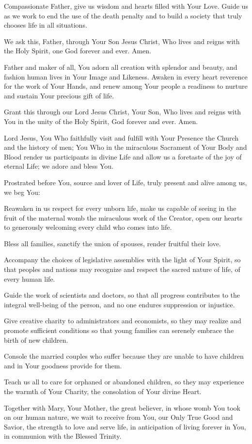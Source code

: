 Compassionate Father, give us wisdom and hearts filled with Your Love.
Guide us as we work to end the use of the death penalty and to build a society that truly chooses life in all situations.

We ask this, Father, through Your Son Jesus Christ, Who lives and reigns with the Holy Spirit, one God forever and ever.
Amen.

Father and maker of all, You adorn all creation with splendor and beauty, and fashion human lives in Your Image and Likeness.
Awaken in every heart reverence for the work of Your Hands, and renew among Your people
a readiness to nurture and sustain Your precious gift of life.

Grant this through our Lord Jesus Christ, Your Son, Who lives and reigns with You in 
the unity of the Holy Spirit, God forever and ever.
Amen.

\label{prayer:benedict_xvi_unborn}
Lord Jesus, 
You Who faithfully visit and fulfill with Your Presence the Church and the history of men;
You Who in the miraculous Sacrament of Your Body and Blood render us participants in divine Life and allow us a foretaste of the joy of eternal Life;
we adore and bless You.

Prostrated before You, source and lover of Life, truly present and alive among us, we beg You:

Reawaken in us respect for every unborn life, make us capable of seeing in the fruit of the maternal womb the miraculous work of the Creator, open our hearts to generously welcoming every child who comes into life.

Bless all families, sanctify the union of spouses, render fruitful their love.

Accompany the choices of legislative assemblies with the light of Your Spirit, so that peoples and nations may recognize and respect the sacred nature of life, of every human life.

Guide the work of scientists and doctors, so that all progress contributes to the integral well-being of the person, and no one endures suppression or injustice.

Give creative charity to administrators and economists, so they may realize and promote sufficient conditions so that young families can serenely embrace the birth of new children.

Console the married couples who suffer because they are unable to have children and in Your goodness provide for them.

Teach us all to care for orphaned or abandoned children, so they may experience the warmth of Your Charity, the consolation of Your divine Heart.

Together with Mary, Your Mother, the great believer, in whose womb You took on our human nature, we wait to receive from You, our Only True Good and Savior, the strength to love and serve life, in anticipation of living forever in You, in communion with the Blessed Trinity.

\newpage